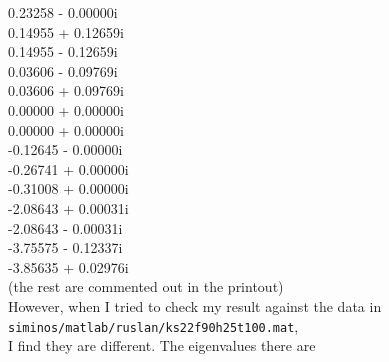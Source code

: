 \begin{description}
   0.23258 - 0.00000i          \\
   0.14955 + 0.12659i          \\
   0.14955 - 0.12659i          \\
   0.03606 - 0.09769i          \\
   0.03606 + 0.09769i          \\
   0.00000 + 0.00000i\\
   0.00000 + 0.00000i\\
  -0.12645 - 0.00000i          \\
  -0.26741 + 0.00000i          \\
  -0.31008 + 0.00000i          \\
  -2.08643 + 0.00031i          \\
  -2.08643 - 0.00031i          \\
  -3.75575 - 0.12337i          \\
  -3.85635 + 0.02976i          \\
         (the rest are commented out in the printout) \\

However, when I tried to check my result against the data in
\\
\texttt{siminos/matlab/ruslan/ks22f90h25t100.mat},
\\
I find they are different. The eigenvalues there are


\end{description}
